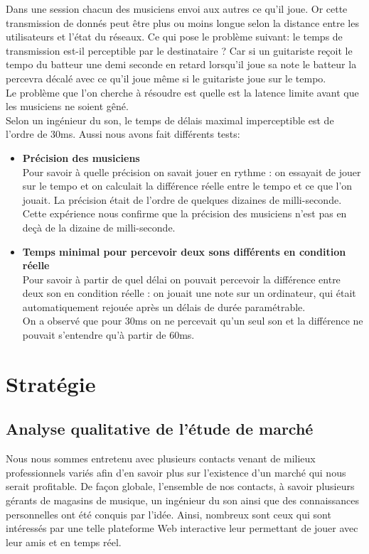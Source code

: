 \documentclass[a4,12pt]{article}
\begin{document}
Dans une session chacun des musiciens envoi aux autres ce qu’il joue. Or cette transmission de donnés peut être plus ou moins longue selon la distance entre les utilisateurs et l’état du réseaux. Ce qui pose le problème suivant: le temps de transmission est-il perceptible par le destinataire ? Car si un guitariste reçoit le tempo du batteur une demi seconde en retard lorsqu’il joue sa note le batteur la percevra décalé avec ce qu’il joue même si le guitariste joue sur le tempo.\\
Le problème que l’on cherche à résoudre est quelle est la latence limite avant que les musiciens ne soient gêné.\\
Selon un ingénieur du son, le temps de délais maximal imperceptible est de l’ordre de 30ms. Aussi nous avons fait différents tests:
\begin{itemize}
    \item \textbf{Précision des musiciens}\\
    Pour savoir à quelle précision on savait jouer en rythme : on essayait de jouer sur le tempo et on calculait la différence réelle entre le tempo et ce que l’on jouait. La précision était de l’ordre de quelques dizaines de milli-seconde.\\
    Cette expérience nous confirme que la précision des musiciens n’est pas en deçà de la dizaine de milli-seconde.
    \item \textbf{Temps minimal pour percevoir deux sons différents en condition réelle}\\
    Pour savoir à partir de quel délai on pouvait percevoir la différence entre deux son en condition réelle : on jouait une note sur un ordinateur, qui était automatiquement rejouée après un délais de durée paramétrable.
    \\
    On a observé que pour 30ms on ne percevait qu’un seul son et la différence ne pouvait s’entendre qu’à partir de 60ms.
\end{itemize}
\newpage
\section{Stratégie}
\subsection{Analyse qualitative de l'étude de marché}
Nous nous sommes entretenu avec plusieurs contacts venant de milieux professionnels variés afin d'en savoir plus sur l'existence d'un marché qui nous serait profitable. De façon globale, l'ensemble de nos contacts, à savoir plusieurs gérants de magasins de musique, un ingénieur du son ainsi que des connaissances personnelles ont été conquis par l'idée. Ainsi, nombreux sont ceux qui sont intéressés par une telle plateforme Web interactive leur permettant de jouer avec leur amis et en temps réel.\\
\\
\end{document}
